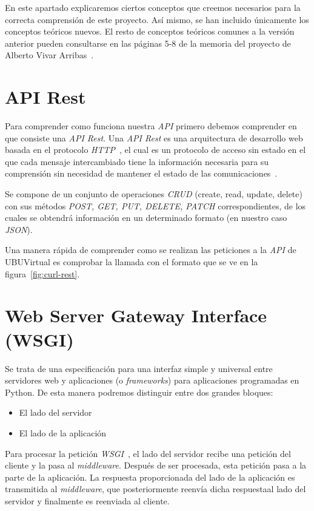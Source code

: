En este apartado explicaremos ciertos conceptos que creemos necesarios para la correcta comprensión de este proyecto. Así mismo, se han incluido únicamente los conceptos teóricos nuevos. El resto de conceptos teóricos comunes a la versión anterior pueden consultarse en las páginas 5-8 de la memoria del proyecto de Alberto Vivar Arribas~\cite{github:alberto-viewer}.

\section{API Rest}\label{sec:api-rest}
Para comprender como funciona nuestra \textit{API} primero debemos comprender en que consiste una \textit{API Rest}. Una \textit{API Rest} es una arquitectura de desarrollo web basada en el protocolo \textit{HTTP}~\cite{wiki:http}, el cual es un protocolo de acceso sin estado en el que cada mensaje intercambiado tiene la información necesaria para su comprensión sin necesidad de mantener el estado de las comunicaciones~\cite{apirestbook}.

Se compone de un conjunto de operaciones \textit{CRUD} (create, read, update, delete) con sus métodos \textit{POST, GET, PUT, DELETE, PATCH} correspondientes, de los cuales se obtendrá información en un determinado formato (en nuestro caso \textit{JSON}).

Una manera rápida de comprender como se realizan las peticiones a la \textit{API} de UBUVirtual es comprobar la llamada con el formato que se ve en la figura~\ref{fig:curl-rest}.

\section{Web Server Gateway Interface (WSGI)}\label{sec:wsgi}
Se trata de una especificación para una interfaz simple y universal entre servidores web y aplicaciones (o \textit{frameworks}) para aplicaciones programadas en Python. De esta manera podremos distinguir entre dos grandes bloques:
\begin{itemize}
	\item El lado del servidor
	\item El lado de la aplicación
\end{itemize}
Para procesar la petición \textit{WSGI}~\cite{wiki:wsgi}, el lado del servidor recibe una petición del cliente y la pasa al \textit{middleware}. Después de ser procesada, esta petición pasa a la parte de la aplicación. La respuesta proporcionada del lado de la aplicación es transmitida al \textit{middleware}, que posteriormente reenvía dicha respuestaal lado del servidor y finalmente es reenviada al cliente.


